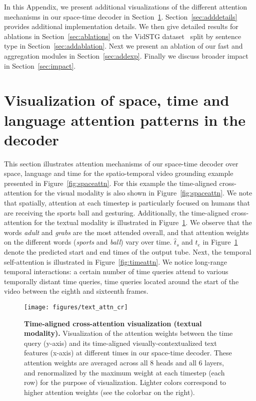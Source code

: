 In this Appendix, we present additional visualizations of the different attention mechanisms in our space-time decoder in Section~\ref{sec:viz}. 
Section~\ref{sec:adddetails} provides additional implementation details. 
We then give detailed results for ablations in Section~\ref{sec:ablations} on the VidSTG dataset~\cite{vidstg} split by sentence type in Section~\ref{sec:addablation}.
Next we present an ablation of our fast and aggregation modules in Section~\ref{sec:addexp}.
Finally we discuss broader impact in Section~\ref{sec:impact}.

\section{Visualization of space, time and language attention patterns in the decoder}\label{sec:viz}
This section illustrates attention mechanisms of our space-time decoder over space, language and time for the spatio-temporal video grounding example presented in Figure~\ref{fig:spaceattn}. 
For this example the time-aligned cross-attention for the visual modality is also shown in Figure~\ref{fig:spaceattn}.
We note that spatially, attention at each timestep is particularly focused on humans that are receiving the sports ball and gesturing.
Additionally, the time-aligned cross-attention for the textual modality is illustrated in Figure~\ref{fig:textattn}. 
We observe that the words \textit{adult} and \textit{grabs} are the most attended overall, and that attention weights on the different words (\eg \textit{sports} and \textit{ball}) vary over time. $\hat{t}_s$ and $\hat{t}_e$ in Figure~\ref{fig:textattn} denote the predicted start and end times of the output tube.
Next, the temporal self-attention is illustrated in Figure~\ref{fig:timeattn}. 
We notice long-range temporal interactions: a certain number of time queries attend to various temporally distant time queries, \eg time queries located around the start of the video between the eighth and sixteenth frames.

\begin{figure}[t]
\centering
\texttt{[image: figures/text\_attn\_cr]}
\vspace{+0.1cm}
\caption{\small \textbf{Time-aligned cross-attention visualization (textual modality).} 
Visualization of the attention weights between the time query (y-axis) and its time-aligned visually-contextualized text features (x-axis) at different times in our space-time decoder. 
These attention weights are averaged across all 8 heads and all 6 layers, and renormalized by the maximum weight at each timestep (\ie each row) for the purpose of visualization. Lighter colors correspond to higher attention weights (see the colorbar on the right).
}
\vspace{+0.1cm}
\label{fig:textattn}
\end{figure}

